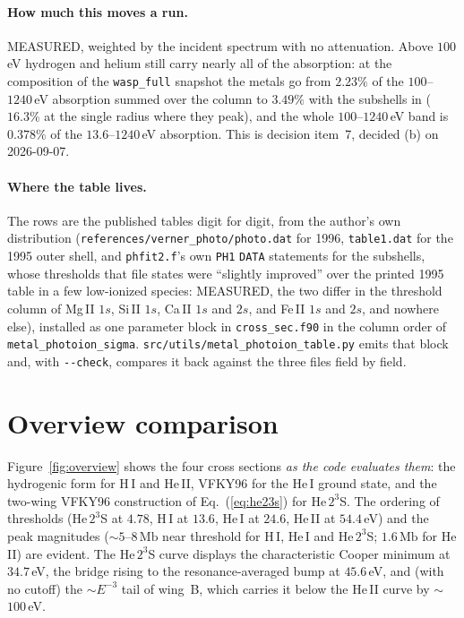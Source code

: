 \documentclass[english,a4paper]{my_memo}
\newcommand{\Mb}{\mathrm{Mb}}
\begin{document}
\paragraph{How much this moves a run.} MEASURED, weighted by the incident
spectrum with no attenuation. Above $100\,$eV hydrogen and helium still
carry nearly all of the absorption: at the composition of the
\texttt{wasp\_full} snapshot the metals go from $2.23\%$ of the
$100$--$1240\,$eV absorption summed over the column to $3.49\%$ with the
subshells in ($16.3\%$ at the single radius where they peak), and the whole
$100$--$1240\,$eV band is $0.378\%$ of the $13.6$--$1240\,$eV absorption.
This is decision item~7, decided (b) on 2026-09-07.

\paragraph{Where the table lives.} The rows are the published tables digit
for digit, from the author's own distribution
(\texttt{references/verner\_photo/photo.dat} for 1996, \texttt{table1.dat}
for the 1995 outer shell, and \texttt{phfit2.f}'s own \texttt{PH1} \texttt{DATA}
statements for the subshells, whose thresholds that file states were
``slightly improved'' over the printed 1995 table in a few low-ionized
species: MEASURED, the two differ in the threshold column of Mg\,II $1s$,
Si\,II $1s$, Ca\,II $1s$ and $2s$, and Fe\,II $1s$ and $2s$, and nowhere
else), installed as one parameter block in
\texttt{cross\_sec.f90} in the column order of
\texttt{metal\_photoion\_sigma}. \texttt{src/utils/metal\_photoion\_table.py}
emits that block and, with \texttt{-{}-check}, compares it back against the
three files field by field.

\section{Overview comparison}\label{sec:overview}

Figure~\ref{fig:overview} shows the four cross sections \emph{as the code
evaluates them}: the hydrogenic form for H\,I and He\,II, VFKY96 for the He\,I
ground state, and the two-wing VFKY96 construction of Eq.~(\ref{eq:he23s}) for
He\,$2^3$S. The ordering of thresholds (He\,$2^3$S at
$4.78$, H\,I at $13.6$, He\,I at $24.6$, He\,II at $54.4\,$eV) and the
peak magnitudes ($\sim$$5$--$8\,\Mb$ near threshold for H\,I, He\,I and
He\,$2^3$S; $1.6\,\Mb$ for He\,II) are evident. The He\,$2^3$S curve
displays the characteristic Cooper minimum at $34.7\,$eV, the bridge rising to
the resonance-averaged bump at $45.6\,$eV, and (with no cutoff) the
$\sim E^{-3}$ tail of wing~B, which carries it below the He\,II curve by
$\sim$$100\,$eV.
\end{document}
